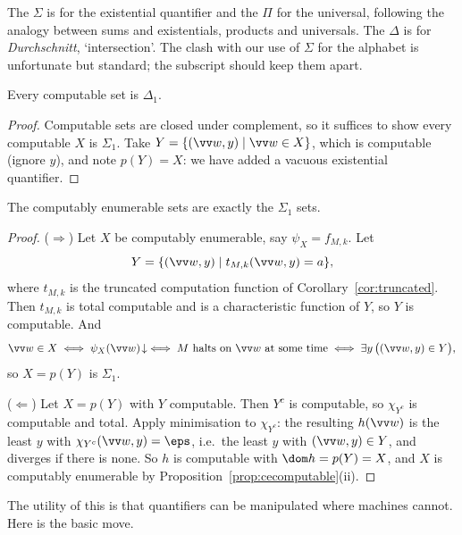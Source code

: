 \begin{remark}
	The $\Sigma$ is for the existential quantifier and the $\Pi$ for the universal, following the analogy between sums and existentials, products and universals. The $\Delta$ is for \emph{Durchschnitt}, `intersection'. The clash with our use of $\Sigma$ for the alphabet is unfortunate but standard; the subscript should keep them apart.
\end{remark}

\begin{proposition}
	Every computable set is $\Delta_1$.
\end{proposition}

\begin{proof}
	Computable sets are closed under complement, so it suffices to show every computable $X$ is $\Sigma_1$. Take $Y = \{(\vv w, y) \mid \vv w \in X\}$, which is computable (ignore $y$), and note $p(Y) = X$: we have added a vacuous existential quantifier.
\end{proof}

\begin{theorem}\label{thm:cesigma1}
	The computably enumerable sets are exactly the $\Sigma_1$ sets.
\end{theorem}

\begin{proof}
	($\Rightarrow$) Let $X$ be computably enumerable, say $\psi_X = f_{M,k}$. Let
	$$Y = \{(\vv w, y) \mid t_{M,k}(\vv w, y) = a\},$$
	where $t_{M,k}$ is the truncated computation function of Corollary~\ref{cor:truncated}. Then $t_{M,k}$ is total computable and is a characteristic function of $Y$, so $Y$ is computable. And
	$$\vv w \in X \iff \psi_X(\vv w)\!\downarrow \iff M \text{ halts on } \vv w \text{ at some time} \iff \exists y\, \big((\vv w,y)\in Y\big),$$
	so $X = p(Y)$ is $\Sigma_1$.

	($\Leftarrow$) Let $X = p(Y)$ with $Y$ computable. Then $Y^c$ is computable, so $\chi_{Y^c}$ is computable and total. Apply minimisation to $\chi_{Y^c}$: the resulting $h(\vv w)$ is the least $y$ with $\chi_{Y^c}(\vv w, y) = \eps$, i.e.\ the least $y$ with $(\vv w, y) \in Y$, and diverges if there is none. So $h$ is computable with $\dom h = p(Y) = X$, and $X$ is computably enumerable by Proposition~\ref{prop:cecomputable}(ii).
\end{proof}

The utility of this is that quantifiers can be manipulated where machines cannot. Here is the basic move.

